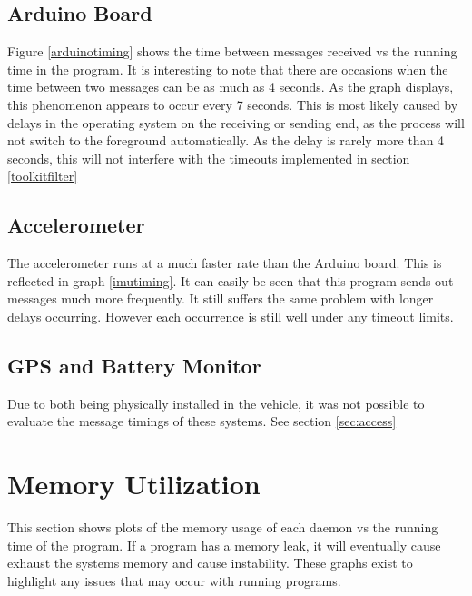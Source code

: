 \subsection{Arduino Board}

Figure \ref{arduinotiming} shows the time between messages received vs the running time in the program. It is interesting to note that there are occasions when the time between two messages can be as much as 4 seconds. As the graph displays, this phenomenon appears to occur every 7 seconds. This is most likely caused by delays in the operating system on the receiving or sending end, as the process will not switch to the foreground automatically. As the delay is rarely more than 4 seconds, this will not interfere with the timeouts implemented in section \ref{toolkitfilter}


\subsection{Accelerometer}

The accelerometer runs at a much faster rate than the Arduino board. This is reflected in graph \ref{imutiming}. It can easily be seen that this program sends out messages much more frequently.  It still suffers the same problem with longer delays occurring. However each occurrence is still well under any timeout limits. 


\subsection{GPS and Battery Monitor}

Due to both being physically installed in the vehicle, it was not possible to evaluate the message timings of these systems. See section \ref{sec:access}


\section{Memory Utilization}

This section shows plots of the memory usage of each daemon vs the running time of the program. If a program has a memory leak, it will eventually cause exhaust the systems memory and cause instability. These graphs exist to highlight any issues that may occur with running programs.

